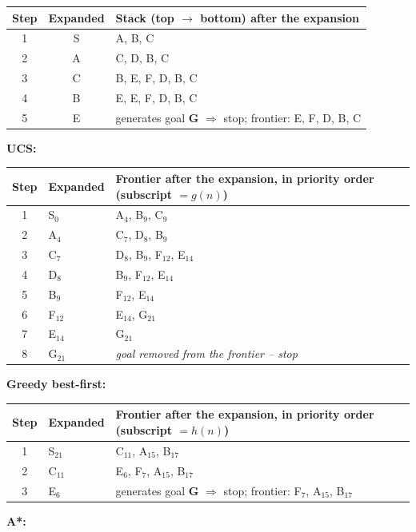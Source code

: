 \documentclass[11pt,a4paper]{article}
\begin{document}
\begin{solbox}
\begin{center}
\begin{tabularx}{\linewidth}{c c >{\raggedright\arraybackslash}X}
Step & Expanded & Stack (top $\rightarrow$ bottom) after the expansion \\ \midrule
1 & S & A, B, C \\
2 & A & C, D, B, C \\
3 & C & B, E, F, D, B, C \\
4 & B & E, E, F, D, B, C \\
5 & E & generates goal \textbf{G} $\Rightarrow$ stop; frontier: E, F, D, B, C \\
\bottomrule\end{tabularx}\end{center}\textbf{UCS:}\begin{center}\small\begin{tabularx}{\linewidth}{c l >{\raggedright\arraybackslash}X}\toprule
Step & Expanded & Frontier after the expansion, in priority order (subscript $=g(n)$) \\ \midrule
1 & S$_{0}$ & A$_{4}$, B$_{9}$, C$_{9}$ \\
2 & A$_{4}$ & C$_{7}$, D$_{8}$, B$_{9}$ \\
3 & C$_{7}$ & D$_{8}$, B$_{9}$, F$_{12}$, E$_{14}$ \\
4 & D$_{8}$ & B$_{9}$, F$_{12}$, E$_{14}$ \\
5 & B$_{9}$ & F$_{12}$, E$_{14}$ \\
6 & F$_{12}$ & E$_{14}$, G$_{21}$ \\
7 & E$_{14}$ & G$_{21}$ \\
8 & G$_{21}$ & \textit{goal removed from the frontier -- stop} \\
\bottomrule\end{tabularx}\end{center}\textbf{Greedy best-first:}\begin{center}\small\begin{tabularx}{\linewidth}{c l >{\raggedright\arraybackslash}X}\toprule
Step & Expanded & Frontier after the expansion, in priority order (subscript $=h(n)$) \\ \midrule
1 & S$_{21}$ & C$_{11}$, A$_{15}$, B$_{17}$ \\
2 & C$_{11}$ & E$_{6}$, F$_{7}$, A$_{15}$, B$_{17}$ \\
3 & E$_{6}$ & generates goal \textbf{G} $\Rightarrow$ stop; frontier: F$_{7}$, A$_{15}$, B$_{17}$ \\
\bottomrule\end{tabularx}\end{center}\textbf{A*:}\begin{center}\small\begin{tabularx}{\linewidth}{c l >{\raggedright\arraybackslash}X}\toprule

\end{tabularx}
\end{center}
\end{solbox}
\end{document}

